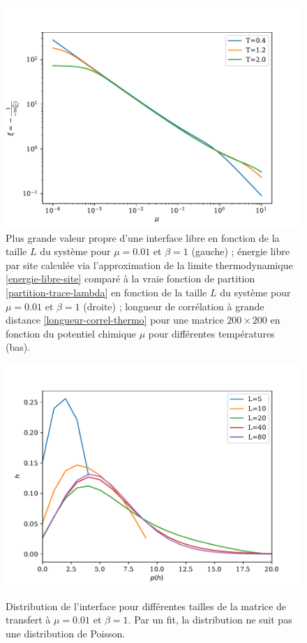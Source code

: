 \begin{figure}
\begin{minipage}[t]{0.5\linewidth}
	\end{minipage}
	\centering
	\begin{minipage}{0.5\linewidth}
    	\includegraphics[width=\linewidth]{chap4/longueur-correl.pdf}
	\end{minipage}
	\caption{Plus grande valeur propre d'une interface libre en fonction de la taille $L$ du système pour $\mu = 0.01$ et $\beta = 1$ (gauche)  ; énergie libre par site calculée via l'approximation de la limite thermodynamique \ref{energie-libre-site} comparé à la vraie fonction de partition \ref{partition-trace-lambda} en fonction de la taille $L$ du système pour $\mu=0.01$ et $\beta = 1$ (droite) ; longueur de corrélation à grande distance \ref{longueur-correl-thermo} pour une matrice $200\times200$ en fonction du potentiel chimique $\mu$ pour différentes températures (bas).}
	\vspace{-0.5cm}
\end{figure}  
	
\begin{figure}
    \centering
	\includegraphics[width=0.5\linewidth]{chap4/distribution-taille-finie.pdf}
	\label{distribution-taille-finie}
	\caption{Distribution de l'interface pour différentes tailles de la matrice de transfert à $\mu=0.01$ et $\beta = 1$. Par un fit, la distribution ne suit pas une distribution de Poisson.}
\end{figure}

